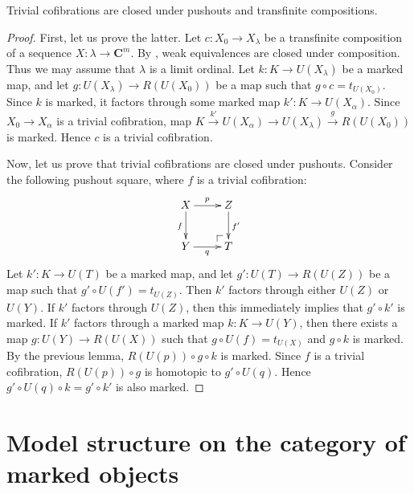 \documentclass[reqno]{amsart}
\makeatletter
\theoremstyle{definition}
\theoremstyle{remark}
\newcommand{\cat}[1]{\mathbf{#1}}
\newcommand{\C}{\cat{C}}
\numberwithin{figure}{section}
\newcommand{\po}[1][dr]{\save*!/#1+1.2pc/#1:(1,-1)@^{|-}\restore}
\makeatother
\begin{document}
\begin{prop}
Trivial cofibrations are closed under pushouts and transfinite compositions.
\end{prop}
\begin{proof}
First, let us prove the latter.
Let $c : X_0 \to X_\lambda$ be a transfinite composition of a sequence $X : \lambda \to \C^m$.
By , weak equivalences are closed under composition.
Thus we may assume that $\lambda$ is a limit ordinal.
Let $k : K \to U(X_\lambda)$ be a marked map, and let $g : U(X_\lambda) \to R(U(X_0))$ be a map such that $g \circ c = t_{U(X_0)}$.
Since $k$ is marked, it factors through some marked map $k' : K \to U(X_\alpha)$.
Since $X_0 \to X_\alpha$ is a trivial cofibration, map $K \xrightarrow{k'} U(X_\alpha) \to U(X_\lambda) \xrightarrow{g} R(U(X_0))$ is marked.
Hence $c$ is a trivial cofibration.

Now, let us prove that trivial cofibrations are closed under pushouts.
Consider the following pushout square, where $f$ is a trivial cofibration:
\[ \xymatrix{ X \ar[r]^p \ar[d]_f & Z \ar[d]^{f'} \\
              Y \ar[r]_q & \po T
            } \]
Let $k' : K \to U(T)$ be a marked map, and let $g' : U(T) \to R(U(Z))$ be a map such that $g' \circ U(f') = t_{U(Z)}$.
Then $k'$ factors through either $U(Z)$ or $U(Y)$.
If $k'$ factors through $U(Z)$, then this immediately implies that $g' \circ k'$ is marked.
If $k'$ factors through a marked map $k : K \to U(Y)$, then there exists a map $g : U(Y) \to R(U(X))$ such that $g \circ U(f) = t_{U(X)}$ and $g \circ k$ is marked.
By the previous lemma, $R(U(p)) \circ g \circ k$ is marked.
Since $f$ is a trivial cofibration, $R(U(p)) \circ g$ is homotopic to $g' \circ U(q)$.
Hence $g' \circ U(q) \circ k = g' \circ k'$ is also marked.
\end{proof}

\section{Model structure on the category of marked objects}
\label{sec:model-structure}
\end{document}
